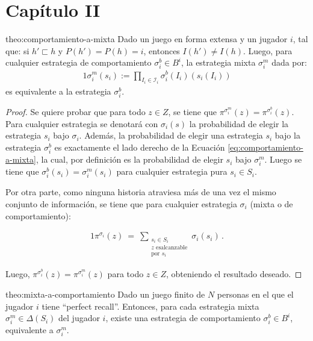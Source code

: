 \section*{Capítulo II}

\begin{reptheorem}{theo:comportamiento-a-mixta}
Dado un juego en forma extensa y un jugador $i$, tal que: si $h' \sqsubset h$ y $P(h') = P(h) = i$, entonces $I(h') \neq I(h)$. Luego, para cualquier estrategia de comportamiento $\sigma^b_i \in B^i$, la estrategia mixta $\sigma^m_i$ dada por:
\begin{alignat}{1}
\sigma^m_i(s_i) := \prod_{I_i \in \mathcal{I}_i} \sigma^b_i(I_i)(s_i(I_i)) \label{eq-apex:comportamiento-a-mixta}
\end{alignat}
es equivalente a la estrategia $\sigma^b_i$.
\end{reptheorem}

\begin{proof}
Se quiere probar que para todo $z \in Z$, se tiene que $\pi^{\sigma^m_i}(z) = \pi^{\sigma^b_i}(z)$. 
Para cualquier estrategia se denotará con $\sigma_i(s)$ la probabilidad de elegir la estrategia $s_i$ bajo $\sigma_i$. Además, la probabilidad de elegir una estrategia $s_i$ bajo la estrategia $\sigma^b_i$ es exactamente el lado derecho de la Ecuación \ref{eq:comportamiento-a-mixta}, la cual, por definición es la probabilidad de elegir $s_i$ bajo $\sigma^m_i$. Luego se tiene que $\sigma_i^b(s_i) = \sigma_i^m(s_i)$ para cualquier estrategia pura $s_i \in S_i$.

Por otra parte, como ninguna historia atraviesa más de una vez el mismo conjunto de información, se tiene que para cualquier estrategia $\sigma_i$ (mixta o de comportamiento):

\begin{alignat}{1}
\label{eq:definicion-mixta}
\pi^{\sigma_i}(z)\ =\ \sum_{\substack{s_i \in S_i \\  z \text{ es} \text{alcanzable} \\ \text{por } s_i} } \sigma_i(s_i) \,.
\end{alignat}

Luego, $\pi^{\sigma_i^b}(z) = \pi^{\sigma_i^m}(z)$ para todo $z \in Z$, obteniendo el resultado deseado. 
\end{proof}


\begin{reptheorem}{theo:mixta-a-comportamiento}
Dado un juego finito de $N$ personas en el que el jugador $i$ tiene ``perfect recall''. Entonces, para cada estrategia mixta $\sigma^m_i \in \Delta(S_i)$ del jugador $i$, existe una estrategia de comportamiento $\sigma^b_i \in B^i$, equivalente a $\sigma^m_i$.
\end{reptheorem}

